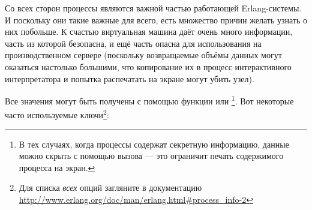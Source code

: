 Со всех сторон процессы являются важной частью работающей Erlang-системы. И поскольку они такие важные для всего, есть множество причин желать узнать о них побольше. К счастью виртуальная машина даёт очень много информации, часть из которой безопасна, и ещё часть опасна для использования на производственном сервере (поскольку возвращаемые объёмы данных могут оказаться настолько большими, что копирование их в процесс интерактивного интерпретатора и попытка распечатать на экране могут убить узел).

Все значения могут быть получены с помощью функции  или \footnote{В тех случаях, когда процессы содержат секретную информацию, данные можно скрыть с помощью вызова  --- это ограничит печать содержимого процесса на экран.}. Вот некоторые часто используемые ключи\footnote{Для списка \emph{всех} опций загляните в документацию \href{http://www.erlang.org/doc/man/erlang.html\#process\_info-2}{http://www.erlang.org/doc/man/erlang.html\#process\_info-2}}:

